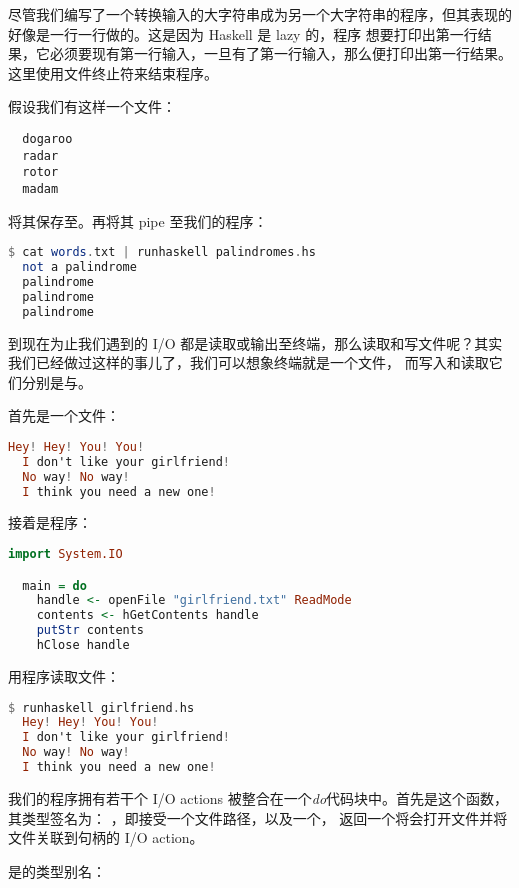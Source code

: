 \documentclass[./main.tex]{subfiles}
\begin{document}
尽管我们编写了一个转换输入的大字符串成为另一个大字符串的程序，但其表现的好像是一行一行做的。这是因为 Haskell 是 lazy 的，程序
想要打印出第一行结果，它必须要现有第一行输入，一旦有了第一行输入，那么便打印出第一行结果。这里使用文件终止符来结束程序。

假设我们有这样一个文件：

\begin{lstlisting}
  dogaroo
  radar
  rotor
  madam
\end{lstlisting}

将其保存至。再将其 pipe 至我们的程序：

\begin{lstlisting}[language=Haskell]
  $ cat words.txt | runhaskell palindromes.hs
  not a palindrome
  palindrome
  palindrome
  palindrome
\end{lstlisting}

到现在为止我们遇到的 I/O 都是读取或输出至终端，那么读取和写文件呢？其实我们已经做过这样的事儿了，我们可以想象终端就是一个文件，
而写入和读取它们分别是与。

首先是一个文件：

\begin{lstlisting}[language=Haskell]
  Hey! Hey! You! You!
  I don't like your girlfriend!
  No way! No way!
  I think you need a new one!
\end{lstlisting}

接着是程序：

\begin{lstlisting}[language=Haskell]
  import System.IO

  main = do
    handle <- openFile "girlfriend.txt" ReadMode
    contents <- hGetContents handle
    putStr contents
    hClose handle
\end{lstlisting}

用程序读取文件：

\begin{lstlisting}[language=Haskell]
  $ runhaskell girlfriend.hs
  Hey! Hey! You! You!
  I don't like your girlfriend!
  No way! No way!
  I think you need a new one!
\end{lstlisting}

我们的程序拥有若干个 I/O actions 被整合在一个\textit{do}代码块中。首先是这个函数，其类型签名为：
，即接受一个文件路径，以及一个，
返回一个将会打开文件并将文件关联到句柄的 I/O action。

是的类型别名：
\end{document}

